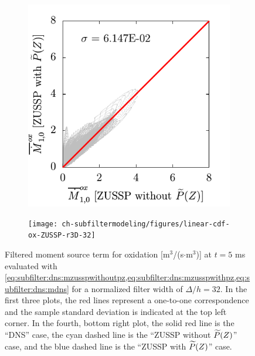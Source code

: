 \begin{figure}[ht]
\begin{subfigure}[b]{0.375\linewidth}
  \end{subfigure}
  \begin{subfigure}[b]{0.375\linewidth}
    \centering
    \includegraphics[width=\linewidth]{ch-subfiltermodeling/figures/lin-Mox4vsMox3-r3D-32}
  \end{subfigure}%
  \begin{subfigure}[b]{0.375\linewidth}
    \centering
    \texttt{[image: ch-subfiltermodeling/figures/linear-cdf-ox-ZUSSP-r3D-32]}
  \end{subfigure}
  \caption[Error Associated with $\pz = \beta(Z;\tf{Z},\tf{Z_V})$ for $\mean{\dot{M}}_{1,0}^{ox}$]{Filtered moment source term for oxidation [m$^3$/(s$\cdot$m$^3$)] at $t = 5$ ms evaluated with \cref{eq:subfilter:dns:mzusspwithoutpz,eq:subfilter:dns:mzusspwithpz,eq:subfilter:dns:mdns} for a normalized filter width of $\Delta/h = 32$. In the first three plots, the red lines represent a one-to-one correspondence and the sample standard deviation is indicated at the top left corner. In the fourth, bottom right plot, the solid red line is the ``DNS'' case, the cyan dashed line is the ``ZUSSP without $\widetilde{P}(Z)$'' case, and the blue dashed line is the ``ZUSSP with $\widetilde{P}(Z)$'' case.}
  \label{fig:subfilter:dns:erroronbetaox}
\end{figure}

